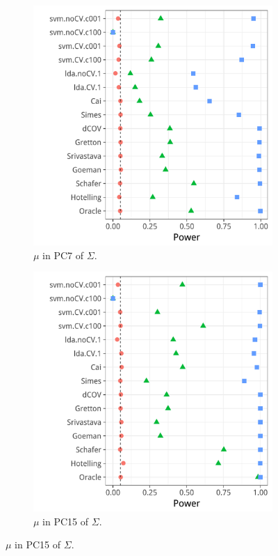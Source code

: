 \documentclass[journal]{IEEEtran}
\begin{document}
\begin{figure}[h]
	\centering
	\caption{Short memory, AR(1) correlation. $\Vert \mu \Vert_2$ fixed. }	
	\label{fig:dependence_4}	
	\begin{subfigure}[t]{.4\columnwidth}
		\centering
		\includegraphics[width=1\columnwidth]{"art/file32"}
		\caption{$\mu$ in PC7 of $\Sigma$.}  
		\label{fig:dependence_41}	
	\end{subfigure}
	\begin{subfigure}[t]{0.4\columnwidth}
		\centering
		\includegraphics[width=1\columnwidth]{"art/file31"}
		\caption{$\mu$ in PC15 of $\Sigma$.}  
		\label{fig:dependence_42}	
	\end{subfigure}
	
\end{figure}
\end{document}
